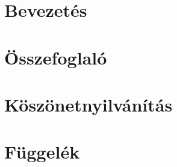 \documentclass[12pt]{report}
\begin{document}
	
	
	
	
	\tableofcontents
	
	\newpage
	\chapter{Bevezetés}
	
	
	\newpage
	
	
	\newpage
	\chapter{Összefoglaló}
	
	
	\newpage
	\chapter{Köszönetnyilvánítás}
	
	
	\newpage
	\printbibliography[
	heading=bibnumbered, title={Irodalomjegyzék}]
	
	\newpage
	\chapter{Függelék}
	
	
	
\end{document}
